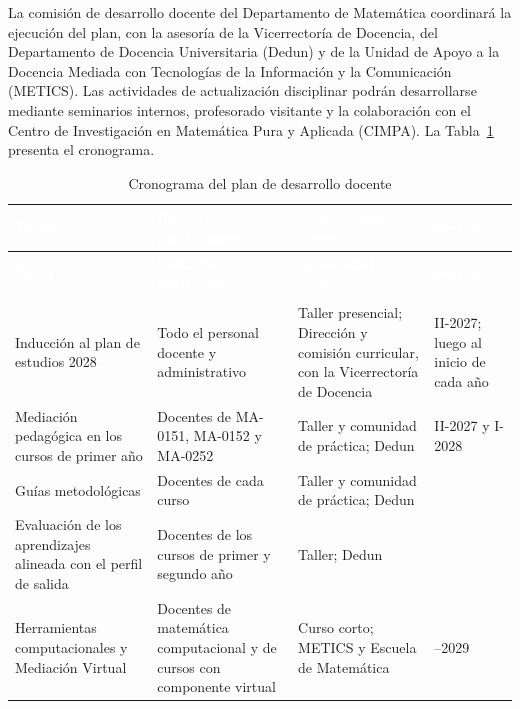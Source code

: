 La comisión de desarrollo docente del Departamento de Matemática coordinará la ejecución del plan, con la asesoría de la Vicerrectoría de Docencia, del Departamento de Docencia Universitaria (Dedun) y de la Unidad de Apoyo a la Docencia Mediada con Tecnologías de la Información y la Comunicación (METICS). Las actividades de actualización disciplinar podrán desarrollarse mediante seminarios internos, profesorado visitante y la colaboración con el Centro de Investigación en Matemática Pura y Aplicada (CIMPA). La Tabla~\ref{tab:cronograma-docente} presenta el cronograma.

\begingroup
\small
\setlength{\tabcolsep}{4pt}%
\renewcommand{\arraystretch}{1.2}%
%
\begin{longtable}{|>{\raggedright\arraybackslash}p{4.6cm}|>{\raggedright\arraybackslash}p{3.3cm}|>{\raggedright\arraybackslash}p{3.6cm}|>{\centering\arraybackslash}p{2.3cm}|}
\caption{Cronograma del plan de desarrollo docente}\label{tab:cronograma-docente}\\
\hline
\rowcolor{Azul-UCR}
\textcolor{white}{\textbf{Tema}} & \textcolor{white}{\textbf{Población participante}} & \textcolor{white}{\textbf{Modalidad y apoyo}} & \textcolor{white}{\textbf{Periodo}} \\ \hline
\endfirsthead
\hline
\rowcolor{Azul-UCR}
\textcolor{white}{\textbf{Tema}} & \textcolor{white}{\textbf{Población participante}} & \textcolor{white}{\textbf{Modalidad y apoyo}} & \textcolor{white}{\textbf{Periodo}} \\ \hline
\endhead
\multicolumn{4}{r}{\footnotesize\textit{Continúa en la página siguiente}} \\
\endfoot
\endlastfoot
Inducción al plan de estudios 2028 & Todo el personal docente y administrativo & Taller presencial; Dirección y comisión curricular, con la Vicerrectoría de Docencia & II-2027; luego al inicio de cada año \\ \hline
Mediación pedagógica en los cursos de primer año & Docentes de MA-0151, MA-0152 y MA-0252 & Taller y comunidad de práctica; Dedun & II-2027 y I-2028 \\ \hline
Guías metodológicas & Docentes de cada curso & Taller y comunidad de práctica; Dedun & 2027 \\ \hline
Evaluación de los aprendizajes alineada con el perfil de salida & Docentes de los cursos de primer y segundo año & Taller; Dedun & 2028 \\ \hline
Herramientas computacionales y Mediación Virtual & Docentes de matemática computacional y de cursos con componente virtual & Curso corto; METICS y Escuela de Matemática & 2028--2029 \\ \hline

\end{longtable}
